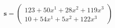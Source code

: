 \documentclass[preview]{standalone}
\begin{document}
\begin{align*}
\mathbf{s} = \begin{pmatrix}123 + 50x^{1} + 28x^{2} + 119x^{3} \\ 10 + 54x^{1} + 5x^{2} + 122x^{3}\end{pmatrix}
\end{align*}
\end{document}
